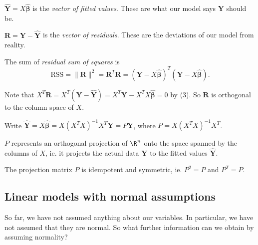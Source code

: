 \documentclass[a4paper]{article}
\begin{document}
\begin{defi}
  $\hat{\mathbf{Y}} = X\hat{\boldsymbol\beta}$ is the \emph{vector of fitted values}. These are what our model says $\mathbf{Y}$ should be.

  $\mathbf{R} = \mathbf{Y} - \hat{\mathbf{Y}}$ is the \emph{vector of residuals}. These are the deviations of our model from reality.

  The sum of \emph{residual sum of squares} is
  \[
    \mathrm{RSS} = \|\mathbf{R}\|^2 = \mathbf{R}^T\mathbf{R} = (\mathbf{Y} - X\hat{\boldsymbol\beta})^T(\mathbf{Y} - X\hat{\boldsymbol\beta}).
  \]
\end{defi}
Note that $X^T\mathbf{R} = X^T(\mathbf{Y} - \hat{\mathbf{Y}}) = X^T\mathbf{Y} - X^TX\hat{\boldsymbol\beta} = 0$ by (3). So $\mathbf{R}$ is orthogonal to the column space of $X$.

Write $\hat{\mathbf{Y}} = X\hat{\boldsymbol\beta} = X(X^TX)^{-1}X^T\mathbf{Y} = P\mathbf{Y}$, where $P = X(X^TX)^{-1}X^T$.

$P$ represents an orthogonal projection of $\R^n$ onto the space spanned by the columns of $X$, ie. it projects the actual data $\mathbf{Y}$ to the fitted values $\hat{\mathbf{Y}}$.

The projection matrix $P$ is idempotent and symmetric, ie. $P^2 = P$ and $P^T = P$.
\subsection{Linear models with normal assumptions}
So far, we have not assumed anything about our variables. In particular, we have not assumed that they are normal. So what further information can we obtain by assuming normality?
\end{document}
